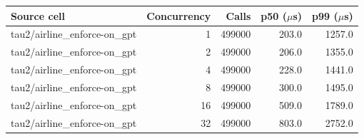 \begin{tabular}{lrrrr}
\toprule
Source cell & Concurrency & Calls & p50 ($\mu$s) & p99 ($\mu$s) \\
\midrule
tau2/airline\_enforce-on\_gpt & 1 & 499000 & 203.0 & 1257.0 \\
tau2/airline\_enforce-on\_gpt & 2 & 499000 & 206.0 & 1355.0 \\
tau2/airline\_enforce-on\_gpt & 4 & 499000 & 228.0 & 1441.0 \\
tau2/airline\_enforce-on\_gpt & 8 & 499000 & 300.0 & 1495.0 \\
tau2/airline\_enforce-on\_gpt & 16 & 499000 & 509.0 & 1789.0 \\
tau2/airline\_enforce-on\_gpt & 32 & 499000 & 803.0 & 2752.0 \\
\bottomrule
\end{tabular}
